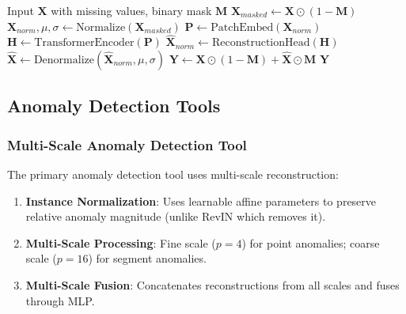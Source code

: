 \begin{algorithm}[H]
\caption{Patch-Transformer Imputation}
\label{alg:patch_impute}
\begin{algorithmic}[1]
\REQUIRE Input $\mathbf{X}$ with missing values, binary mask $\mathbf{M}$
\STATE $\mathbf{X}_{masked} \leftarrow \mathbf{X} \odot (1 - \mathbf{M})$ 
\STATE $\mathbf{X}_{norm}, \mu, \sigma \leftarrow \text{Normalize}(\mathbf{X}_{masked})$
\STATE $\mathbf{P} \leftarrow \text{PatchEmbed}(\mathbf{X}_{norm})$
\STATE $\mathbf{H} \leftarrow \text{TransformerEncoder}(\mathbf{P})$
\STATE $\hat{\mathbf{X}}_{norm} \leftarrow \text{ReconstructionHead}(\mathbf{H})$ 
\STATE $\hat{\mathbf{X}} \leftarrow \text{Denormalize}(\hat{\mathbf{X}}_{norm}, \mu, \sigma)$
\STATE $\mathbf{Y} \leftarrow \mathbf{X} \odot (1 - \mathbf{M}) + \hat{\mathbf{X}} \odot \mathbf{M}$ 
\RETURN $\mathbf{Y}$
\end{algorithmic}
\end{algorithm}

\subsection{Anomaly Detection Tools}
\label{appx:anomaly_tools}

\begin{table}[h]
\centering
\caption{Anomaly Detection Tools Overview}
\label{tab:anomaly_tools}
\end{table}

\subsubsection{Multi-Scale Anomaly Detection Tool}
The primary anomaly detection tool uses multi-scale reconstruction:
\begin{enumerate}[leftmargin=*, itemsep=1pt]
    \item \textbf{Instance Normalization}: Uses learnable affine parameters to preserve relative anomaly magnitude (unlike RevIN which removes it).
    \item \textbf{Multi-Scale Processing}: Fine scale ($p=4$) for point anomalies; coarse scale ($p=16$) for segment anomalies.
    \item \textbf{Multi-Scale Fusion}: Concatenates reconstructions from all scales and fuses through MLP.
\end{enumerate}

